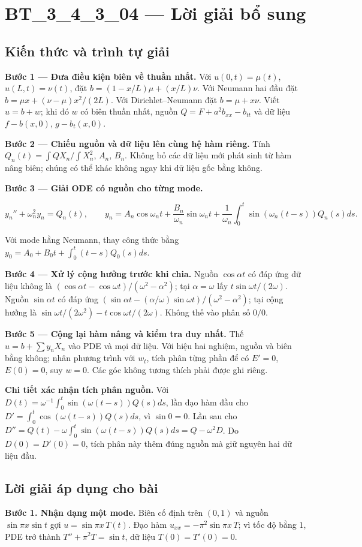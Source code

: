 \documentclass[10pt,a4paper]{article}
\begin{document}
\section*{BT\_3\_4\_3\_04 — Lời giải bổ sung}
\subsection*{Kiến thức và trình tự giải}
\textbf{Bước 1 — Đưa điều kiện biên về thuần nhất.} Với $u(0,t)=\mu(t)$, $u(L,t)=\nu(t)$, đặt $b=(1-x/L)\mu+(x/L)\nu$. Với Neumann hai đầu đặt $b=\mu x+(\nu-\mu)x^2/(2L)$. Với Dirichlet–Neumann đặt $b=\mu+x\nu$. Viết $u=b+w$; khi đó $w$ có biên thuần nhất, nguồn $Q=F+a^2b_{xx}-b_{tt}$ và dữ liệu $f-b(x,0)$, $g-b_t(x,0)$.

\textbf{Bước 2 — Chiếu nguồn và dữ liệu lên cùng hệ hàm riêng.} Tính $Q_n(t)=\int QX_n/\int X_n^2$, $A_n$, $B_n$. Không bỏ các dữ liệu mới phát sinh từ hàm nâng biên; chúng có thể khác không ngay khi dữ liệu gốc bằng không.

\textbf{Bước 3 — Giải ODE có nguồn cho từng mode.}


\[
y_n''+\omega_n^2y_n=Q_n(t),\qquad
y_n=A_n\cos\omega_nt+\frac{B_n}{\omega_n}\sin\omega_nt+\frac1{\omega_n}\int_0^t\sin(\omega_n(t-s))Q_n(s)ds.
\]


Với mode hằng Neumann, thay công thức bằng $y_0=A_0+B_0t+\int_0^t(t-s)Q_0(s)ds$.

\textbf{Bước 4 — Xử lý cộng hưởng trước khi chia.} Nguồn $\cos\alpha t$ có đáp ứng dữ liệu không là $(\cos\alpha t-\cos\omega t)/(\omega^2-\alpha^2)$; tại $\alpha=\omega$ lấy $t\sin\omega t/(2\omega)$. Nguồn $\sin\alpha t$ có đáp ứng $(\sin\alpha t-(\alpha/\omega)\sin\omega t)/(\omega^2-\alpha^2)$; tại cộng hưởng là $\sin\omega t/(2\omega^2)-t\cos\omega t/(2\omega)$. Không thế vào phân số $0/0$.

\textbf{Bước 5 — Cộng lại hàm nâng và kiểm tra duy nhất.} Thế $u=b+\sum y_nX_n$ vào PDE và mọi dữ liệu. Với hiệu hai nghiệm, nguồn và biên bằng không; nhân phương trình với $w_t$, tích phân từng phần để có $E'=0$, $E(0)=0$, suy $w=0$. Các góc không tương thích phải được ghi riêng.

\textbf{Chi tiết xác nhận tích phân nguồn.} Với $D(t)=\omega^{-1}\int_0^t\sin(\omega(t-s))Q(s)ds$, lần đạo hàm đầu cho $D'=\int_0^t\cos(\omega(t-s))Q(s)ds$, vì $\sin0=0$. Lần sau cho $D''=Q(t)-\omega\int_0^t\sin(\omega(t-s))Q(s)ds=Q-\omega^2D$. Do $D(0)=D'(0)=0$, tích phân này thêm đúng nguồn mà giữ nguyên hai dữ liệu đầu.
\subsection*{Lời giải áp dụng cho bài}
\textbf{Bước 1. Nhận dạng một mode.} Biên cố định trên $(0,1)$ và nguồn $\sin\pi x\sin t$ gợi $u=\sin\pi x\,T(t)$. Đạo hàm $u_{xx}=-\pi^2\sin\pi x\,T$; vì tốc độ bằng $1$, PDE trở thành $T''+\pi^2T=\sin t$, dữ liệu $T(0)=T'(0)=0$.
\end{document}
